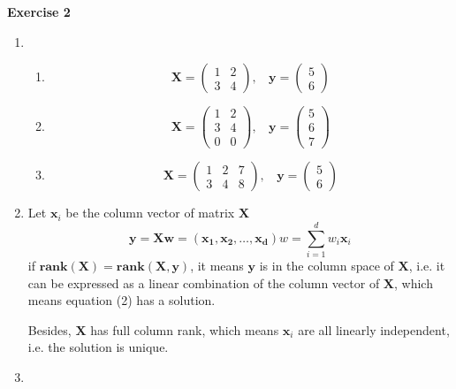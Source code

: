 \documentclass[11pt,letter,notitlepage]{article}
\newcommand{\rank}[1]{ \textbf{rank}  (#1)  }
\begin{document}
\begin{solution}
	\textbf{Exercise 2}
	\begin{enumerate}
	 \item 
	 \begin{enumerate}
		\item 
		\[\mathbf{X}=\begin{pmatrix}
						1&2\\3&4
					\end{pmatrix},~~~~
		\mathbf{y}=\begin{pmatrix}
					5\\6
				\end{pmatrix}\]
	
		\item
		\[\mathbf{X}=\begin{pmatrix}
						1&2\\3&4\\0&0
					\end{pmatrix},~~~~
		\mathbf{y}=\begin{pmatrix}
					5\\6\\7
				\end{pmatrix}\]
				
		\item
		\[\mathbf{X}=\begin{pmatrix}
						1&2&7\\3&4&8
					\end{pmatrix},~~~~
		\mathbf{y}=\begin{pmatrix}
					5\\6
				\end{pmatrix}\]
	 \end{enumerate}
	
	 \item
	 Let $\mathbf{x}_i$ be the column vector of matrix $\mathbf{X}$
	 \[\mathbf{y=Xw=(x_1,x_2,\dots, x_d)}w=\sum_{i=1}^d{w_i \mathbf{x}_i}\]
	 if $\rank{\mathbf{X}}=\rank{\mathbf{X,y}}$, it means $\mathbf{y}$ is in the column space of $\mathbf{X}$, i.e. it can be expressed as a linear combination of the column vector of $\mathbf{X}$, which means equation (2) has a solution.
	 
	 Besides, $\mathbf{X}$ has full column rank, which means $\mathbf{x}_i$ are all linearly independent, i.e. the solution is unique.
	 
	 \item
	 
	\end{enumerate}

\end{solution}
\end{document}
